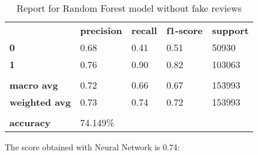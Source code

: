 \begin{table}[h!]
    \centering
    \begin{tabular}{lllll}
        \rowcolor[HTML]{EEEEEE} 
        \cellcolor[HTML]{FBFBFB} & \textbf{precision} & \textbf{recall} & \textbf{f1-score} & \textbf{support} \\
        \rowcolor[HTML]{EEEEEE} 
        \textbf{0}               & 0.68               & 0.41            & 0.51              & 50930            \\
        \rowcolor[HTML]{EEEEEE} 
        \textbf{1}               & 0.76               & 0.90            & 0.82              & 103063           \\
        \rowcolor[HTML]{FBFBFB} 
        &                    &                 &                   &                  \\
        \rowcolor[HTML]{EEEEEE} 
        \textbf{macro avg}       & 0.72               & 0.66            & 0.67              & 153993           \\
        \rowcolor[HTML]{EEEEEE} 
        \textbf{weighted avg}    & 0.73               & 0.74            & 0.72              & 153993           \\
        \rowcolor[HTML]{FBFBFB} 
        &                    &                 &                   &                  \\
        \rowcolor[HTML]{EEEEEE} 
        \textbf{accuracy}        & \multicolumn{4}{l}{\cellcolor[HTML]{EEEEEE}74.149\%}                         
    \end{tabular}
    \caption{Report for Random Forest model without fake reviews}
    \label{tab:rf-res-no-fake}
\end{table}

The score obtained with Neural Network is 0.74:

